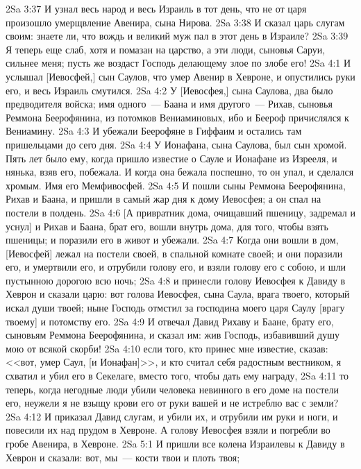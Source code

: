 \vs 2Sa 3:37 И узнал весь народ и весь Израиль в тот день, что не от царя произошло умерщвление Авенира, сына Нирова.
\vs 2Sa 3:38 И сказал царь слугам своим: знаете ли, что вождь и великий муж пал в этот день в Израиле?
\vs 2Sa 3:39 Я теперь еще слаб, хотя и помазан на царство, а эти люди, сыновья Саруи, сильнее меня; пусть же воздаст Господь делающему злое по злобе его!
\vs 2Sa 4:1 И услышал [Иевосфей,] сын Саулов, что умер Авенир в Хевроне, и опустились руки его, и весь Израиль смутился.
\rsbpar\vs 2Sa 4:2 У [Иевосфея,] сына Саулова, два было предводителя войска; имя одного~--- Баана и имя другого~--- Рихав, сыновья Реммона Беерофянина, из потомков Вениаминовых, ибо и Беероф причислялся к Вениамину.
\vs 2Sa 4:3 И убежали Беерофяне в Гиффаим и остались там пришельцами до сего дня.
\vs 2Sa 4:4 У Ионафана, сына Саулова, был сын хромой. Пять лет было ему, когда пришло известие о Сауле и Ионафане из Изрееля, и нянька, взяв его, побежала. И когда она бежала поспешно, то он упал, и сделался хромым. Имя его Мемфивосфей.
\vs 2Sa 4:5 И пошли сыны Реммона Беерофянина, Рихав и Баана, и пришли в самый жар дня к дому Иевосфея; а он спал на постели в полдень.
\vs 2Sa 4:6 [А привратник дома, очищавший пшеницу, задремал и уснул] и Рихав и Баана, брат его, вошли внутрь дома,  для того, чтобы взять пшеницы; и поразили его в живот и убежали.
\vs 2Sa 4:7 Когда они вошли в дом, [Иевосфей] лежал на постели своей, в спальной комнате своей; и они поразили его, и умертвили его, и отрубили голову его, и взяли голову его с собою, и шли пустынною дорогою всю ночь;
\vs 2Sa 4:8 и принесли голову Иевосфея к Давиду в Хеврон и сказали царю: вот голова Иевосфея, сына Саула, врага твоего, который искал души твоей; ныне Господь отмстил за господина моего царя Саулу [врагу твоему] и потомству его.
\vs 2Sa 4:9 И отвечал Давид Рихаву и Баане, брату его, сыновьям Реммона Беерофянина, и сказал им: жив Господь, избавивший душу мою от всякой скорби!
\vs 2Sa 4:10 если того, кто принес мне известие, сказав: <<вот, умер Саул, [и Ионафан]>>, и кто считал себя радостным вестником, я схватил и убил его в Секелаге, вместо того, чтобы дать ему награду,
\vs 2Sa 4:11 то теперь, когда негодные люди убили человека невинного в его доме на постели его, неужели я не взыщу крови его от руки вашей и не истреблю вас с земли?
\vs 2Sa 4:12 И приказал Давид слугам, и убили их, и отрубили им руки и ноги, и повесили их над прудом в Хевроне. А голову Иевосфея взяли и погребли во гробе Авенира, в Хевроне.
\vs 2Sa 5:1 И пришли все колена Израилевы к Давиду в Хеврон и сказали: вот, мы~--- кости твои и плоть твоя;
